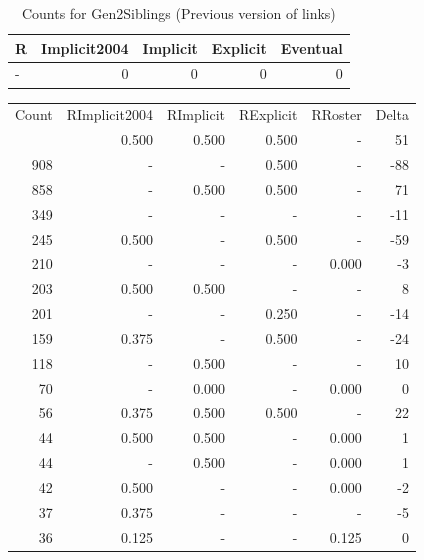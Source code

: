 \documentclass[a4paper]{article}\usepackage{graphicx, color}
\begin{document}
\begin{table}[ht]
\centering
{\large
\begin{tabular}{lrrrr}
  \hline
R & Implicit2004 & Implicit & Explicit & Eventual \\ 
  \hline
- &   0 &   0 &   0 &   0 \\ 
   \hline
\end{tabular}
}
\caption{Counts for Gen2Siblings (Previous version of links)} 
\end{table}



\begin{table}[ht]
\centering
\begin{tabular}{rrrrrr}
  \hline
Count & RImplicit2004 & RImplicit & RExplicit & RRoster & Delta \\ 
  \rowcolor{goodColor}  \hline
1243 & 0.500 & 0.500 & 0.500 & - & 51 \\ 
   \rowcolor{sosoColor} 908 & - & - & 0.500 & - & -88 \\ 
   \rowcolor{goodColor} 858 & - & 0.500 & 0.500 & - & 71 \\ 
   \rowcolor{nullColor} 349 & - & - & - & - & -11 \\ 
   \rowcolor{sosoColor} 245 & 0.500 & - & 0.500 & - & -59 \\ 
   \rowcolor{nullColor} 210 & - & - & - & 0.000 & -3 \\ 
  203 & 0.500 & 0.500 & - & - & 8 \\ 
   \rowcolor{sosoColor} 201 & - & - & 0.250 & - & -14 \\ 
   \rowcolor{sosoColor} 159 & 0.375 & - & 0.500 & - & -24 \\ 
  118 & - & 0.500 & - & - & 10 \\ 
  70 & - & 0.000 & - & 0.000 & 0 \\ 
   \rowcolor{goodColor} 56 & 0.375 & 0.500 & 0.500 & - & 22 \\ 
  44 & 0.500 & 0.500 & - & 0.000 & 1 \\ 
  44 & - & 0.500 & - & 0.000 & 1 \\ 
   \rowcolor{nullColor} 42 & 0.500 & - & - & 0.000 & -2 \\ 
   \rowcolor{nullColor} 37 & 0.375 & - & - & - & -5 \\ 
   \rowcolor{nullColor} 36 & 0.125 & - & - & 0.125 & 0 \\ 

\end{tabular}
\end{table}
\end{document}
